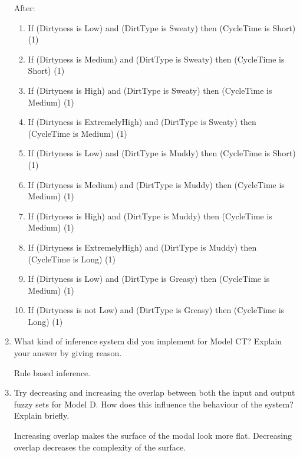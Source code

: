\documentclass[11pt]{article}
\begin{document}
\begin{enumerate}[label=(\alph*)]
  After:
  \begin{enumerate}[label=(\arabic*)]
  \item If (Dirtyness is Low) and (DirtType is Sweaty) then (CycleTime is Short) (1)
  \item If (Dirtyness is Medium) and (DirtType is Sweaty) then (CycleTime is Short) (1)
  \item If (Dirtyness is High) and (DirtType is Sweaty) then (CycleTime is Medium) (1)
  \item If (Dirtyness is ExtremelyHigh) and (DirtType is Sweaty) then (CycleTime is Medium) (1)
  \item If (Dirtyness is Low) and (DirtType is Muddy) then (CycleTime is Short) (1)\item If (Dirtyness is Medium) and (DirtType is Muddy) then (CycleTime is Medium) (1)
  \item If (Dirtyness is High) and (DirtType is Muddy) then (CycleTime is Medium) (1)
  \item If (Dirtyness is ExtremelyHigh) and (DirtType is Muddy) then (CycleTime is Long) (1)
  \item If (Dirtyness is Low) and (DirtType is Greasy) then (CycleTime is Medium) (1)
  \item If (Dirtyness is not Low) and (DirtType is Greasy) then (CycleTime is Long) (1)
  \end{enumerate}

  \item What kind of inference system did you implement for Model CT? Explain your answer by giving reason.

  Rule based inference.

  \item Try decreasing and increasing the overlap between both the input and output fuzzy sets for Model D. How does this inﬂuence the behaviour of the system? Explain brieﬂy.

  Increasing overlap makes the surface of the modal look more flat. Decreasing overlap decreases the complexity of the surface.


\end{enumerate}
\end{document}
